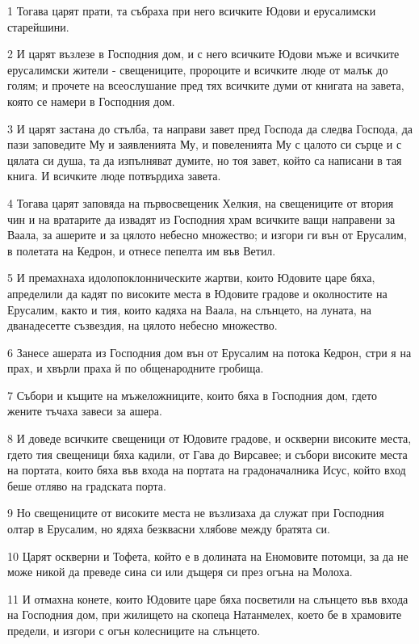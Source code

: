 \par 1 Тогава царят прати, та събраха при него всичките Юдови и ерусалимски старейшини.
\par 2 И царят възлезе в Господния дом, и с него всичките Юдови мъже и всичките ерусалимски жители - свещениците, пророците и всичките люде от малък до голям; и прочете на всеослушание пред тях всичките думи от книгата на завета, която се намери в Господния дом.
\par 3 И царят застана до стълба, та направи завет пред Господа да следва Господа, да пази заповедите Му и заявленията Му, и повеленията Му с цалото си сърце и с цялата си душа, та да изпълняват думите, но тоя завет, който са написани в тая книга. И всичките люде потвърдиха завета.
\par 4 Тогава царят заповяда на първосвещеник Хелкия, на свещениците от втория чин и на вратарите да извадят из Господния храм всичките ващи направени за Ваала, за ашерите и за цялото небесно множество; и изгори ги вън от Ерусалим, в полетата на Кедрон, и отнесе пепелта им във Ветил.
\par 5 И премахнаха идолопоклонническите жартви, които Юдовите царе бяха, апределили да кадят по високите места в Юдовите градове и околностите на Ерусалим, както и тия, които кадяха на Ваала, на слънцето, на луната, на дванадесетте съзвездия, на цялото небесно множество.
\par 6 Занесе ашерата из Господния дом вън от Ерусалим на потока Кедрон, стри я на прах, и хвърли праха й по общенародните гробища.
\par 7 Събори и къщите на мъжеложниците, които бяха в Господния дом, гдето жените тъчаха завеси за ашера.
\par 8 И доведе всичките свещеници от Юдовите градове, и оскверни високите места, гдето тия свещеници бяха кадили, от Гава до Вирсавее; и събори високите места на портата, които бяха във входа на портата на градоначалника Исус, който вход беше отляво на градската порта.
\par 9 Но свещениците от високите места не възлизаха да служат при Господния олтар в Ерусалим, но ядяха безквасни хлябове между братята си.
\par 10 Царят оскверни и Тофета, който е в долината на Еномовите потомци, за да не може никой да преведе сина си или дъщеря си през огъна на Молоха.
\par 11 И отмахна конете, които Юдовите царе бяха посветили на слънцето във входа на Господния дом, при жилището на скопеца Натанмелех, което бе в храмовите предели, и изгори с огън колесниците на слънцето.
